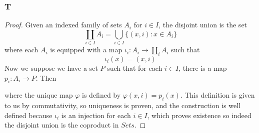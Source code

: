 \documentclass{article}
\begin{document}
\subsubsection{T}\label{1.3.T}
\begin{proof}
    Given an indexed family of sets $A_i$ for $i\in I$, the disjoint union is the set 
    \[
    \coprod_{i\in I} A_i=\bigcup_{i\in I}\{(x,i):x\in A_i\}
    \]
    where each $A_i$ is equipped with a map $\iota_i:A_i\to \coprod_i A_i$ such that
    \[
    \iota_i(x)=(x,i)
    \]
    Now we suppose we have a set $P$ such that for each $i\in I$, there is a map $p_i:A_i\to P$. Then
    
    \begin{center}
    \end{center}
    where the unique map $\varphi$ is defined by $\varphi(x,i)=p_i(x)$. This definition is given to us by commutativity, so uniqueness is proven, and the construction is well defined because $\iota_i$ is an injection for each $i\in I$, which proves existence so indeed the disjoint union is the coproduct in $Sets$.
\end{proof}
\end{document}
